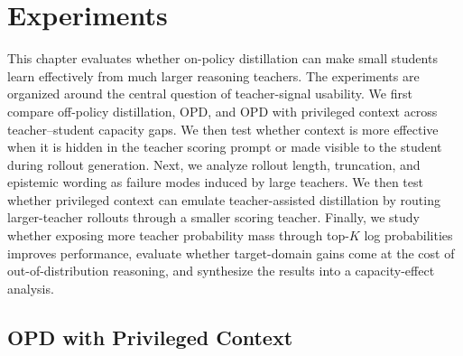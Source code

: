 \chapter{Experiments}

This chapter evaluates whether on-policy distillation can make small students learn effectively from much larger reasoning teachers. The experiments are organized around the central question of teacher-signal usability. We first compare off-policy distillation, OPD, and OPD with privileged context across teacher--student capacity gaps. We then test whether context is more effective when it is hidden in the teacher scoring prompt or made visible to the student during rollout generation. Next, we analyze rollout length, truncation, and epistemic wording as failure modes induced by large teachers. We then test whether privileged context can emulate teacher-assisted distillation by routing larger-teacher rollouts through a smaller scoring teacher. Finally, we study whether exposing more teacher probability mass through top-$K$ log probabilities improves performance, evaluate whether target-domain gains come at the cost of out-of-distribution reasoning, and synthesize the results into a capacity-effect analysis.

\section{OPD with Privileged Context} \label{sec: exp_opd_and_pc}

